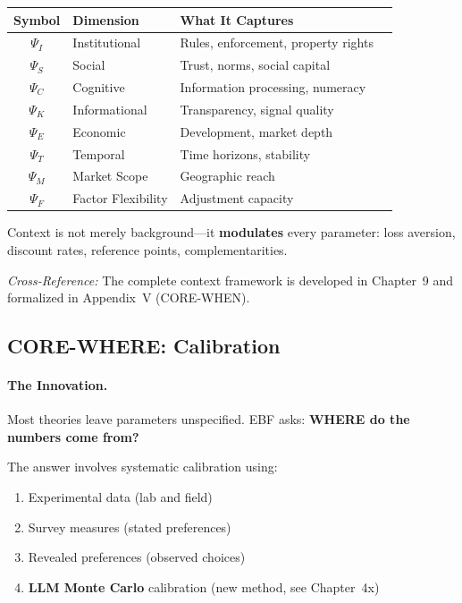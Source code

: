 \begin{center}
\small
\renewcommand{\arraystretch}{1.2}
\begin{tabular}{@{}clll@{}}
\toprule
\textbf{Symbol} & \textbf{Dimension} & \textbf{What It Captures} \\
\midrule
$\Psi_I$ & Institutional & Rules, enforcement, property rights \\
$\Psi_S$ & Social & Trust, norms, social capital \\
$\Psi_C$ & Cognitive & Information processing, numeracy \\
$\Psi_K$ & Informational & Transparency, signal quality \\
$\Psi_E$ & Economic & Development, market depth \\
$\Psi_T$ & Temporal & Time horizons, stability \\
$\Psi_M$ & Market Scope & Geographic reach \\
$\Psi_F$ & Factor Flexibility & Adjustment capacity \\
\bottomrule
\end{tabular}
\end{center}

Context is not merely background---it \textbf{modulates} every parameter:
loss aversion, discount rates, reference points, complementarities.

\textit{Cross-Reference:} The complete context framework is developed in
Chapter~9 and formalized in Appendix~V (CORE-WHEN).

\subsection{CORE-WHERE: Calibration}
\label{sec:10c-where}

\paragraph{The Innovation.}
Most theories leave parameters unspecified. EBF asks: \textbf{WHERE do
the numbers come from?}

The answer involves systematic calibration using:
\begin{enumerate}
\item Experimental data (lab and field)
\item Survey measures (stated preferences)
\item Revealed preferences (observed choices)
\item \textbf{LLM Monte Carlo} calibration (new method, see Chapter~4x)
\end{enumerate}

